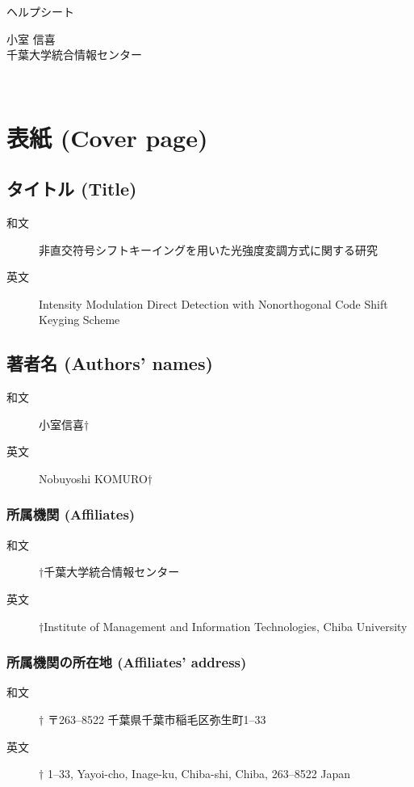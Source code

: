 ﻿\documentclass[a4j,10pt]{jarticle}
\begin{document}
\begin{center}
\large
ヘルプシート
\end{center}
\begin{flushright}
小室 信喜 \\
千葉大学統合情報センター
\end{flushright}
\hrulefill \\
\section{表紙 (Cover page)}
\subsection{タイトル (Title)}
\begin{description}
 \item[和文] 非直交符号シフトキーイングを用いた光強度変調方式に関する研究
 \item[英文] Intensity Modulation Direct Detection with Nonorthogonal Code Shift Keyging Scheme
\end{description}
%
\subsection{著者名 (Authors' names)}
\begin{description}
 \item[和文] 
小室信喜$\dagger$%
 \item[英文] 
Nobuyoshi KOMURO$\dagger$%
\end{description}
%
\subsubsection{所属機関 (Affiliates)}
\begin{description}
 \item[和文] 
$\dagger$千葉大学統合情報センター %
 \item[英文] 
$\dagger$Institute of Management and Information Technologies, Chiba University %
\end{description}
%
\subsubsection{所属機関の所在地 (Affiliates' address)}
\begin{description}
 \item[和文] 
$\dagger$ 〒263--8522 千葉県千葉市稲毛区弥生町1--33 %
 \item[英文] 
$\dagger$ 1--33, Yayoi-cho, Inage-ku, Chiba-shi, Chiba, 263--8522 Japan %
\end{description}
%
\end{document}
